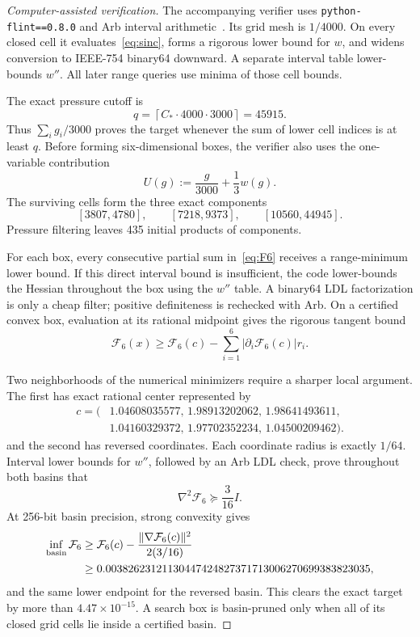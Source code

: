 \documentclass[11pt]{article}
\newcommand{\cF}{\mathcal F}
\begin{document}
\begin{proof}[Computer-assisted verification]
The accompanying verifier uses \texttt{python-flint==0.8.0} and Arb interval
arithmetic~\cite{Johansson17}.  Its grid mesh is $1/4000$.  On every closed
cell it evaluates~\eqref{eq:sinc}, forms a rigorous lower bound for $w$, and
widens conversion to IEEE-754 binary64 downward.  A separate interval table
lower-bounds $w''$.  All later range queries use minima of those cell bounds.

The exact pressure cutoff is
\[
 q=\left\lceil C_*\cdot4000\cdot3000\right\rceil=45915.
\]
Thus $\sum_i g_i/3000$ proves the target whenever the sum of lower cell
indices is at least $q$.  Before forming six-dimensional boxes, the verifier
also uses the one-variable contribution
\[
 U(g):=\frac g{3000}+\frac13w(g).
\]
The surviving cells form the three exact components
\[
 [3807,4780],\qquad[7218,9373],\qquad[10560,44945].
\]
Pressure filtering leaves 435 initial products of components.

For each box, every consecutive partial sum in~\eqref{eq:F6} receives a
range-minimum lower bound.  If this direct interval bound is insufficient,
the code lower-bounds the Hessian throughout the box using the $w''$ table.
A binary64 LDL factorization is only a cheap filter; positive definiteness is
rechecked with Arb.  On a certified convex box, evaluation at its rational
midpoint gives the rigorous tangent bound
\[
 \cF_6(x)\ge\cF_6(c)
 -\sum_{i=1}^6|\partial_i\cF_6(c)|r_i.
\]

Two neighborhoods of the numerical minimizers require a sharper local
argument.  The first has exact rational center represented by
\begin{equation}\label{eq:basin-center}
 \begin{aligned}
 c=(&1.04608035577,\,1.98913202062,\,1.98641493611,\\
    &1.04160329372,\,1.97702352234,\,1.04500209462).
 \end{aligned}
\end{equation}
and the second has reversed coordinates.  Each coordinate radius is exactly
$1/64$.  Interval lower bounds for $w''$, followed by an Arb LDL check, prove
throughout both basins that
\begin{equation}\label{eq:strong-convexity}
 \nabla^2\cF_6\succeq\frac3{16}I.
\end{equation}
At 256-bit basin precision, strong convexity gives
\begin{align}
 \inf_{\text{basin}}\cF_6
 &\ge \cF_6(c)-\frac{\|\nabla\cF_6(c)\|^2}{2(3/16)}\notag\\
 &\ge0.00382623121130447424827371713006270699383823035,
 \label{eq:basin-lower}
\end{align}
and the same lower endpoint for the reversed basin.  This clears the exact
target by more than $4.47\times10^{-15}$.  A search box is basin-pruned only
when all of its closed grid cells lie inside a certified basin.


\end{proof}
\end{document}
